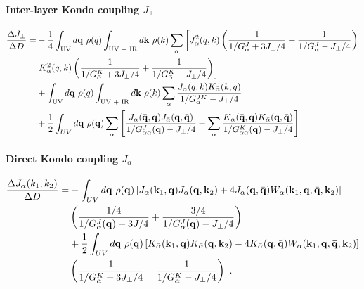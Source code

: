 \paragraph{Inter-layer Kondo coupling \(J_\perp\)}
\begin{equation}\begin{aligned}
	\frac{\Delta J_\perp}{\Delta D} =& -\frac{1}{4}\int_\text{UV} d{\bf q}~\rho(q) \int_\text{UV + IR} d{\bf k}~\rho(k) \sum_\alpha \left[J_\alpha^2(q,k)\left(\frac{1}{1/G_\alpha^J + 3J_\perp/4} + \frac{1}{1/G_\alpha^J - J_\perp/4}\right)\right.\\
									 &\left. K_\alpha^2(q,k)\left(\frac{1}{1/G_{\bar\alpha}^K + 3J_\perp/4} + \frac{1}{1/G_{\bar\alpha}^K - J_\perp/4}\right)\right]\\
									 &+ \int_\text{UV} d{\bf q}~\rho(q) \int_\text{UV + IR} d{\bf k}~\rho(k)\sum_\alpha \frac{J_\alpha(q,k)K_{\bar\alpha}(k, q)}{1/G^{JK}_\alpha - J_\perp/4}\\
									 &+ \frac{1}{2} \int_{UV} d{\bf q} ~\rho({\bf q}) \sum_\alpha \left[\frac{J_\alpha(\bar{\bf q},{\bf q}) J_{\bar\alpha}({\bf q},\bar{\bf q})}{1/G^J_{\alpha\alpha}({\bf q}) - J_\perp/4} + \sum_\alpha \frac{K_\alpha(\bar{\bf q},{\bf q}) K_{\bar\alpha}({\bf q},\bar{\bf q})}{1/G^K_{\alpha\alpha}({\bf q}) - J_\perp/4}\right]
\end{aligned}\end{equation}

\paragraph{Direct Kondo coupling \(J_\alpha\)}
\begin{equation}\begin{aligned}
	\frac{\Delta J_\alpha(k_1, k_2)}{\Delta D} =& -\int_{UV} d{\bf q} ~\rho({\bf q}) \left[J_\alpha({\bf k}_1, {\bf q})J_\alpha({\bf q}, {\bf k}_2) + 4J_\alpha({\bf q}, \bar {\bf q})W_\alpha({\bf k}_1, {\bf q}, \bar {\bf q}, {\bf k}_2)\right]\\
	&\left(\frac{1/4}{1/G_\alpha^J({\bf q}) + 3J/4} + \frac{3/4}{1/G_\alpha^J({\bf q}) - J_\perp/4}\right)\\
	&+ \frac{1}{2}\int_{UV} d{\bf q} ~\rho({\bf q}) \left[K_{\bar\alpha}({\bf k}_1, {\bf q})K_{\bar\alpha}({\bf q}, {\bf k}_2) - 4K_{\bar\alpha}({\bf q}, \bar {\bf q})W_{\alpha}({\bf k}_1, {\bf q},  {\bf \bar q}, {\bf k}_2)\right]\\
	&\left(\frac{1}{1/ G_{\alpha}^K + 3J_\perp/4}+ \frac{1}{1/ G_{\alpha}^K - J_\perp/4}\right)~.
\end{aligned}\end{equation}

